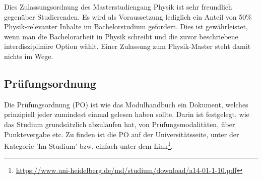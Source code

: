Dies Zulassungsordnung des Masterstudiengang Physik ist sehr freundlich gegenüber Studierenden. Es wird als Voraussetzung lediglich ein Anteil von 50\% Physik-relevanter Inhalte im Bachelorstudium gefordert. Dies ist gewährleistet, wenn man die Bachelorarbeit in Physik schreibt und die zuvor beschriebene interdisziplinäre Option wählt. Einer Zulassung zum Physik-Master steht damit nichts im Wege.

\subsection{Prüfungsordnung}

Die Prüfungsordnung (PO) ist wie das Modulhandbuch ein Dokument, welches prinzipiell jeder zumindest einmal gelesen haben sollte. Darin ist festgelegt, wie das Studium grundsätzlich abzulaufen hat, von Prüfungsmodalitäten, über Punktevergabe etc. Zu finden ist die PO auf der Universitätsseite, unter der Kategorie 'Im Studium' bzw. einfach unter dem Link\footnote{\url{https://www.uni-heidelberg.de/md/studium/download/a14-01-1-10.pdf}}.
